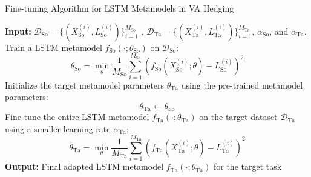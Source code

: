 \documentclass[9pt,handout]{beamer}
\begin{document}
\begin{frame}{Fine-tuning Algorithm for LSTM Metamodels in VA Hedging}

    \begin{algorithm}[H]
        \caption{Fine-tuning Algorithm for LSTM Metamodels in VA Hedging}
        \begin{algorithmic}[1]
            \STATE \textbf{Input:} $\mathcal{D}_{\text{So}} = \{(X_{\text{So}}^{(i)}, L_{\text{So}}^{(i)})\}_{i=1}^{M_{\text{So}}}$ , $\mathcal{D}_{\text{Ta}} = \{(X_{\text{Ta}}^{(i)}, L_{\text{Ta}}^{(i)})\}_{i=1}^{M_{\text{Ta}}}$, $\alpha_{\text{So}}$, and $\alpha_{\text{Ta}}$.
            \STATE Train a LSTM metamodel $f_{\text{So}}(\cdot; \theta_{\text{So}})$ on $\mathcal{D}_{\text{So}}$:
            \begin{equation*}
                \theta_{\text{So}} = \min_{\theta} \frac{1}{M_{\text{So}}} \sum_{i=1}^{M_{\text{So}}} \left( f_{\text{So}}(X_{\text{So}}^{(i)}; \theta) - L_{\text{So}}^{(i)} \right)^2
            \end{equation*}
            \STATE Initialize the target metamodel parameters $\theta_{\text{Ta}}$ using the pre-trained metamodel parameters:
            \begin{equation*}
                \theta_{\text{Ta}} \gets \theta_{\text{So}}
            \end{equation*}
            \STATE Fine-tune the entire LSTM metamodel $f_{\text{Ta}}(\cdot; \theta_{\text{Ta}})$ on the target dataset $\mathcal{D}_{\text{Ta}}$ using a smaller learning rate $\alpha_{\text{Ta}}$:
            \begin{equation*}
                \theta_{\text{Ta}} = \min_{\theta} \frac{1}{M_{\text{Ta}}} \sum_{i=1}^{M_{\text{Ta}}} \left( f_{\text{Ta}}(X_{\text{Ta}}^{(i)}; \theta) - L_{\text{Ta}}^{(i)} \right)^2
            \end{equation*}
            \STATE \textbf{Output:} Final adapted LSTM metamodel $f_{\text{Ta}}(\cdot; \theta_{\text{Ta}})$ for the target task
        \end{algorithmic}
    \end{algorithm}

\end{frame}
\end{document}
